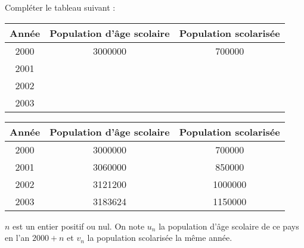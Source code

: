 \begin{questions}
	\question[2] Compléter le tableau suivant :
	
	\begin{center}
		\begin{tabular}{|@{\ }c@{\ }|@{\ }c@{\ }|@{\ }c@{\ }|}
			\hline
			\textbf{Année} & \textbf{Population d'âge scolaire} & \textbf{Population scolarisée} \\ \hline
			\num{2000}     & \num{3000000}                      & \num{700000}                   \\ \hline
			\num{2001}     &                                    &                                \\ \hline
			\num{2002}     &                                    &                                \\ \hline
			\num{2003}     &                                    &                                \\ \hline
		\end{tabular}
	\end{center}

	\begin{solution}
		\begin{center}
			\begin{tabular}{|@{\ }c@{\ }|@{\ }c@{\ }|@{\ }c@{\ }|}
				\hline
				\textbf{Année} & \textbf{Population d'âge scolaire} & \textbf{Population scolarisée} \\ \hline
				\num{2000}     & \num{3000000}                      & \num{700000}                   \\ \hline
				\num{2001}     &  \num{3060000}                     &  \num{850000}                    \\ \hline
				\num{2002}     &  \num{3121200}                      &  \num{1000000}                  \\ \hline
				\num{2003}     & \num{3183624}                      &   \num{1150000}               \\ \hline
			\end{tabular}
		\end{center}
	\end{solution}

	
	\question $n$ est un entier positif ou nul. On note $u_n$ la population d'âge scolaire de ce pays en l'an $2000 + n$ et $v_n$ la population scolarisée la même année.
	

\end{questions}
